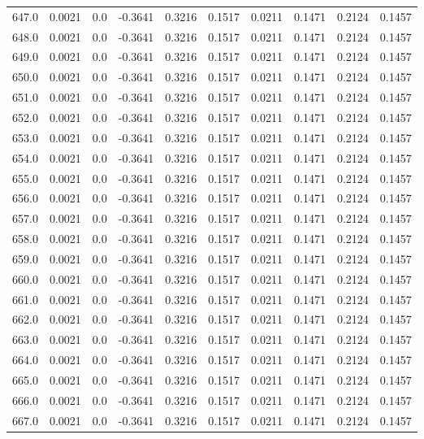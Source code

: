 \begin{longtable}{lrrrrrrrrr}
647.0 & 0.0021 & 0.0 & -0.3641 & 0.3216 & 0.1517 & 0.0211 & 0.1471 & 0.2124 & 0.1457 \\
648.0 & 0.0021 & 0.0 & -0.3641 & 0.3216 & 0.1517 & 0.0211 & 0.1471 & 0.2124 & 0.1457 \\
649.0 & 0.0021 & 0.0 & -0.3641 & 0.3216 & 0.1517 & 0.0211 & 0.1471 & 0.2124 & 0.1457 \\
650.0 & 0.0021 & 0.0 & -0.3641 & 0.3216 & 0.1517 & 0.0211 & 0.1471 & 0.2124 & 0.1457 \\
651.0 & 0.0021 & 0.0 & -0.3641 & 0.3216 & 0.1517 & 0.0211 & 0.1471 & 0.2124 & 0.1457 \\
652.0 & 0.0021 & 0.0 & -0.3641 & 0.3216 & 0.1517 & 0.0211 & 0.1471 & 0.2124 & 0.1457 \\
653.0 & 0.0021 & 0.0 & -0.3641 & 0.3216 & 0.1517 & 0.0211 & 0.1471 & 0.2124 & 0.1457 \\
654.0 & 0.0021 & 0.0 & -0.3641 & 0.3216 & 0.1517 & 0.0211 & 0.1471 & 0.2124 & 0.1457 \\
655.0 & 0.0021 & 0.0 & -0.3641 & 0.3216 & 0.1517 & 0.0211 & 0.1471 & 0.2124 & 0.1457 \\
656.0 & 0.0021 & 0.0 & -0.3641 & 0.3216 & 0.1517 & 0.0211 & 0.1471 & 0.2124 & 0.1457 \\
657.0 & 0.0021 & 0.0 & -0.3641 & 0.3216 & 0.1517 & 0.0211 & 0.1471 & 0.2124 & 0.1457 \\
658.0 & 0.0021 & 0.0 & -0.3641 & 0.3216 & 0.1517 & 0.0211 & 0.1471 & 0.2124 & 0.1457 \\
659.0 & 0.0021 & 0.0 & -0.3641 & 0.3216 & 0.1517 & 0.0211 & 0.1471 & 0.2124 & 0.1457 \\
660.0 & 0.0021 & 0.0 & -0.3641 & 0.3216 & 0.1517 & 0.0211 & 0.1471 & 0.2124 & 0.1457 \\
661.0 & 0.0021 & 0.0 & -0.3641 & 0.3216 & 0.1517 & 0.0211 & 0.1471 & 0.2124 & 0.1457 \\
662.0 & 0.0021 & 0.0 & -0.3641 & 0.3216 & 0.1517 & 0.0211 & 0.1471 & 0.2124 & 0.1457 \\
663.0 & 0.0021 & 0.0 & -0.3641 & 0.3216 & 0.1517 & 0.0211 & 0.1471 & 0.2124 & 0.1457 \\
664.0 & 0.0021 & 0.0 & -0.3641 & 0.3216 & 0.1517 & 0.0211 & 0.1471 & 0.2124 & 0.1457 \\
665.0 & 0.0021 & 0.0 & -0.3641 & 0.3216 & 0.1517 & 0.0211 & 0.1471 & 0.2124 & 0.1457 \\
666.0 & 0.0021 & 0.0 & -0.3641 & 0.3216 & 0.1517 & 0.0211 & 0.1471 & 0.2124 & 0.1457 \\
667.0 & 0.0021 & 0.0 & -0.3641 & 0.3216 & 0.1517 & 0.0211 & 0.1471 & 0.2124 & 0.1457 \\

\end{longtable}
